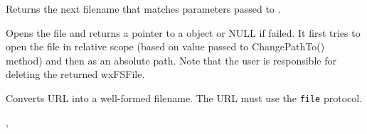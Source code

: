 \label{wxfilesystemfindnext}


Returns the next filename that matches parameters passed to .

\label{wxfilesystemopenfile}


Opens the file and returns a pointer to a  object
or NULL if failed. It first tries to open the file in relative scope
(based on value passed to ChangePathTo() method) and then as an
absolute path.  Note that the user is responsible for deleting the returned
wxFSFile.  

\label{wxfilesystemurltofilename}


Converts URL into a well-formed filename. The URL must use the {\tt file} 
protocol.


, 

